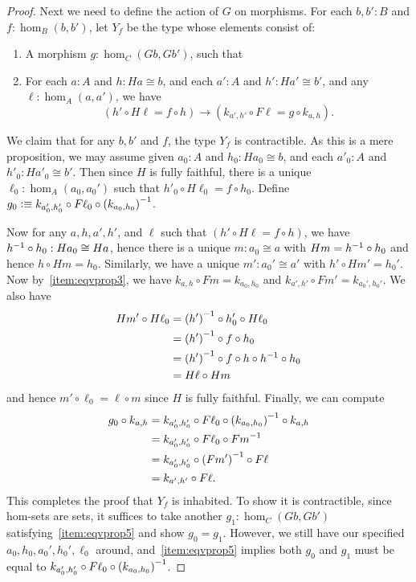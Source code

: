 \begin{proof}
  Next we need to define the action of $G$ on morphisms.
  For each $b,b':B$ and $f:\hom_B(b,b')$, let $Y_f$ be the type whose elements consist of:
  \begin{enumerate}[resume]
  \item A morphism $g:\hom_C(Gb,Gb')$, such that
  \item For each $a:A$ and $h:Ha\cong b$, and each $a':A$ and $h':Ha'\cong b'$, and any $\ell:\hom_A(a,a')$, we have\label{item:eqvprop5}
    \[ (h' \circ H\ell = f \circ h)
    \to
    (k_{a',h'} \circ F\ell = g\circ k_{a,h}). \]
  \end{enumerate}
  We claim that for any $b,b'$ and $f$, the type $Y_f$ is contractible.
  As this is a mere proposition, we may assume given $a_0:A$ and $h_0:Ha_0\cong b$, and each $a'_0:A$ and $h'_0:Ha'_0\cong b'$.
  Then since $H$ is fully faithful, there is a unique $\ell_0:\hom_A(a_0,a_0')$ such that $h'_0 \circ H\ell_0 = f \circ h_0$.
  Define $g_0 \vcentcolon\equiv k_{a_0',h_0'} \circ F \ell_0 \circ {(k_{a_0,h_0})}^{-1}$.

  Now for any $a,h,a',h'$, and $\ell$ such that $(h' \circ H\ell = f \circ h)$, we have ${h}^{-1}\circ h_0:Ha_0\cong Ha$, hence there is a unique $m:a_0\cong a$ with $Hm = {h}^{-1}\circ h_0$ and hence $h\circ Hm = h_0$.
  Similarly, we have a unique $m':a_0'\cong a'$ with $h'\circ Hm' = h_0'$.
  Now by~\ref{item:eqvprop3}, we have $k_{a,h}\circ Fm = k_{a_0,h_0}$ and $k_{a',h'}\circ Fm' = k_{a_0',h_0'}$.
  We also have
  \begin{align*}
    Hm' \circ H\ell_0
    &= {(h')}^{-1} \circ h_0' \circ H\ell_0\\
    &= {(h')}^{-1} \circ f \circ h_0\\
    &= {(h')}^{-1} \circ f \circ h \circ {h}^{-1} \circ h_0\\
    &= H\ell \circ Hm
  \end{align*}
  and hence $m'\circ \ell_0 = \ell\circ m$ since $H$ is fully faithful.
  Finally, we can compute
  \begin{align*}
    g_0 \circ k_{a,h}
    &= k_{a_0',h_0'} \circ F \ell_0 \circ {(k_{a_0,h_0})}^{-1} \circ k_{a,h}\\
    &= k_{a_0',h_0'} \circ F \ell_0 \circ {Fm}^{-1}\\
    &= k_{a_0',h_0'} \circ {(Fm')}^{-1} \circ F\ell\\
    &= k_{a',h'}\circ F\ell.
  \end{align*}
  This completes the proof that $Y_f$ is inhabited.
  To show it is contractible, since hom-sets are sets, it suffices to take another $g_1:\hom_C(Gb,Gb')$ satisfying~\ref{item:eqvprop5} and show $g_0=g_1$.
  However, we still have our specified $a_0,h_0,a_0',h_0',\ell_0$ around, and~\ref{item:eqvprop5} implies both $g_0$ and $g_1$ must be equal to $k_{a_0',h_0'} \circ F \ell_0 \circ {(k_{a_0,h_0})}^{-1}$.


\end{proof}
